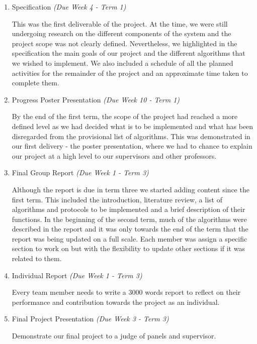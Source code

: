 \begin{enumerate}
	\item Specification \emph{(Due Week 4 - Term 1)}
	
	This was the first deliverable of the project. At the time, we were still undergoing research on the different components of the system and the project scope was not clearly defined. Nevertheless, we highlighted in the specification the main goals of our project and the different algorithms that we wished to implement. We also included a schedule of all the planned activities for the remainder of the project and an approximate time taken to complete them.
	
    \item Progress Poster Presentation \emph{(Due Week 10 - Term 1)}
    
	By the end of the first term, the scope of the project had reached a more defined level as we had decided what is to be implemented and what has been disregarded from the provisional list of algorithms. This was demonstrated in our first delivery - the poster presentation, where we had to chance to explain our project at a high level to our supervisors and other professors.
    
    \item Final Group Report \emph{(Due Week 1 - Term 3)}
    
	Although the report is due in term three we started adding content since the first term. This included the introduction, literature review, a list of algorithms and protocols to be implemented and a brief description of their functions. In the beginning of the second term, much of the algorithms were described in the report and it was only towards the end of the term that the report was being updated on a full scale. Each member was assign a specific section to work on but with the flexibility to update other sections if it was related to them.
	
    \item Individual Report \emph{(Due Week 1 - Term 3)}
    
	Every team member needs to write a 3000 words report to reflect on their performance and contribution towards the project as an individual.
    
    \item Final Project Presentation \emph{(Due Week 3 - Term 3)}
    
    Demonstrate our final project to a judge of panels and supervisor.
 
\end{enumerate}

